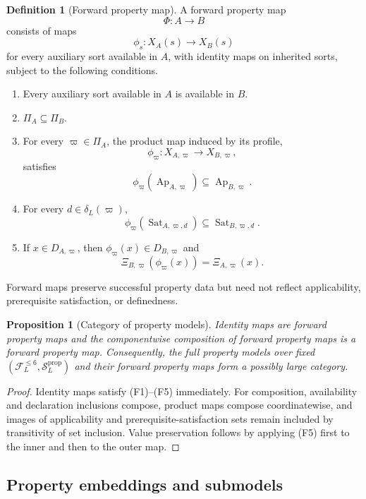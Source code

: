 \documentclass[11pt]{article}
\newcommand{\FVI}{\mathcal F_{L}^{\le 6}}
\newcommand{\Sprop}{\mathcal S_{L}^{\mathrm{prop}}}
\newcommand{\Ap}{\operatorname{Ap}}
\newcommand{\Sat}{\operatorname{Sat}}
\newtheorem{proposition}[theorem]{Proposition}
\theoremstyle{definition}
\newtheorem{definition}[theorem]{Definition}
\theoremstyle{remark}
\begin{document}
\begin{definition}[Forward property map]
\label{def:forward-map}
A forward property map
\[
\Phi:A\longrightarrow B
\]
consists of maps
\[
\phi_s:X_A(s)\longrightarrow X_B(s)
\]
for every auxiliary sort available in \(A\), with identity maps on inherited sorts, subject to the following conditions.
\begin{enumerate}[label=(F\arabic*)]
\item Every auxiliary sort available in \(A\) is available in \(B\).
\item \(\Pi_A\subseteq\Pi_B\).
\item For every \(\varpi\in\Pi_A\), the product map induced by its profile,
\[
\phi_{\varpi}:X_{A,\varpi}\longrightarrow X_{B,\varpi},
\]
satisfies
\[
\phi_{\varpi}(\Ap_{A,\varpi})\subseteq\Ap_{B,\varpi}.
\]
\item For every \(d\in\delta_L(\varpi)\),
\[
\phi_{\varpi}(\Sat_{A,\varpi,d})\subseteq\Sat_{B,\varpi,d}.
\]
\item If \(x\in D_{A,\varpi}\), then \(\phi_{\varpi}(x)\in D_{B,\varpi}\) and
\[
\Xi_{B,\varpi}(\phi_{\varpi}(x))=\Xi_{A,\varpi}(x).
\]
\end{enumerate}
\end{definition}

Forward maps preserve successful property data but need not reflect applicability, prerequisite satisfaction, or definedness.

\begin{proposition}[Category of property models]
Identity maps are forward property maps and the componentwise composition of forward property maps is a forward property map.
Consequently, the full property models over fixed \((\FVI,\Sprop)\) and their forward property maps form a possibly large category.
\end{proposition}

\begin{proof}
Identity maps satisfy (F1)--(F5) immediately.
For composition, availability and declaration inclusions compose, product maps compose coordinatewise, and images of applicability and prerequisite-satisfaction sets remain included by transitivity of set inclusion.
Value preservation follows by applying (F5) first to the inner and then to the outer map.
\end{proof}

\subsection{Property embeddings and submodels}
\end{document}
